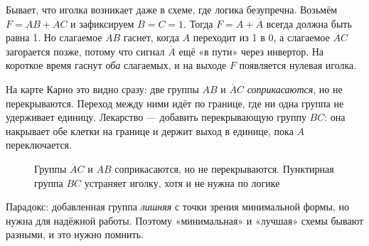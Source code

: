 Бывает, что иголка возникает даже в схеме, где логика безупречна. Возьмём
$F = AB + \overline{A}C$ и зафиксируем $B=C=1$. Тогда $F = A + \overline{A}$
всегда должна быть равна 1. Но слагаемое $AB$ гаснет, когда $A$ переходит из
1 в 0, а слагаемое $\overline{A}C$ загорается позже, потому что сигнал
$\overline{A}$ ещё «в пути» через инвертор. На короткое время гаснут
\emph{оба} слагаемых, и на выходе $F$ появляется нулевая иголка.

На карте Карно это видно сразу: две группы $AB$ и $\overline{A}C$
\emph{соприкасаются}, но не перекрываются. Переход между ними идёт по
границе, где ни одна группа не удерживает единицу. Лекарство --- добавить
перекрывающую группу $BC$: она накрывает обе клетки на границе и держит
выход в единице, пока $A$ переключается.

\begin{figure}[H]
\centering
{}
\caption{Группы $\overline{A}C$ и $AB$ соприкасаются, но не перекрываются.
Пунктирная группа $BC$ устраняет иголку, хотя и не нужна по логике}
\label{fig:hazard_karnaugh}
\end{figure}

Парадокс: добавленная группа \emph{лишняя} с точки зрения минимальной
формы, но нужна для надёжной работы. Поэтому «минимальная» и «лучшая» схемы
бывают разными, и это нужно помнить.

